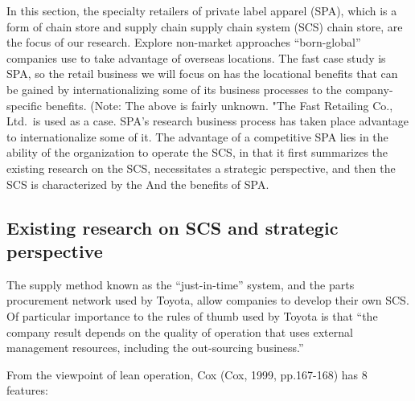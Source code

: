 \documentclass[12pt,]{article}
\begin{document}
In this section, the specialty retailers of private label apparel (SPA),
which is a form of chain store and supply chain supply chain system
(SCS) chain store, are the focus of our research. Explore non-market
approaches ``born-global'' companies use to take advantage of overseas
locations. The fast case study is SPA, so the retail business we will
focus on has the locational benefits that can be gained by
internationalizing some of its business processes to the
company-specific benefits. (Note: The above is fairly unknown. "The Fast
Retailing Co., Ltd.~is used as a case. SPA's research business process
has taken place advantage to internationalize some of it. The advantage
of a competitive SPA lies in the ability of the organization to operate
the SCS, in that it first summarizes the existing research on the SCS,
necessitates a strategic perspective, and then the SCS is characterized
by the And the benefits of SPA.

\hypertarget{existing-research-on-scs-and-strategic-perspective}{%
\subsection{Existing research on SCS and strategic
perspective}\label{existing-research-on-scs-and-strategic-perspective}}

The supply method known as the ``just-in-time'' system, and the parts
procurement network used by Toyota, allow companies to develop their own
SCS. Of particular importance to the rules of thumb used by Toyota is
that ``the company result depends on the quality of operation that uses
external management resources, including the out-sourcing business.''

From the viewpoint of lean operation, Cox (Cox, 1999, pp.167-168) has 8
features:
\end{document}
